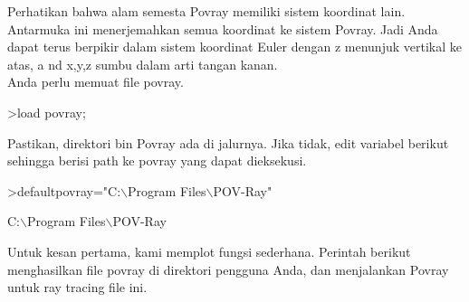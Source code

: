 \documentclass{article}
\begin{document}
\begin{eulernotebook}
\begin{eulercomment}
\begin{eulercomment}
\begin{eulercomment}
Perhatikan bahwa alam semesta Povray memiliki sistem koordinat lain.
Antarmuka ini menerjemahkan semua koordinat ke sistem Povray. Jadi
Anda dapat terus berpikir dalam sistem koordinat Euler dengan z
menunjuk vertikal ke atas, a nd x,y,z sumbu dalam arti tangan kanan.\\
Anda perlu memuat file povray.
\end{eulercomment}
\begin{eulerprompt}
>load povray;
\end{eulerprompt}
\begin{eulercomment}
Pastikan, direktori bin Povray ada di jalurnya. Jika tidak, edit
variabel berikut sehingga berisi path ke povray yang dapat dieksekusi.
\end{eulercomment}
\begin{eulerprompt}
>defaultpovray="C:\(\backslash\)Program Files\(\backslash\)POV-Ray"
\end{eulerprompt}
\begin{euleroutput}
  C:\(\backslash\)Program Files\(\backslash\)POV-Ray
\end{euleroutput}
\begin{eulercomment}
Untuk kesan pertama, kami memplot fungsi sederhana. Perintah berikut
menghasilkan file povray di direktori pengguna Anda, dan menjalankan
Povray untuk ray tracing file ini.


\end{eulercomment}
\end{eulercomment}
\end{eulercomment}
\end{eulernotebook}
\end{document}
